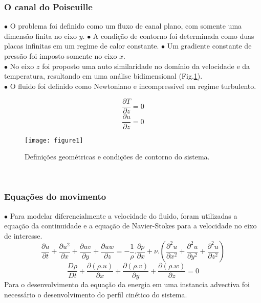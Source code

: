 \documentclass[xcolor=dvipsnames,10pt,aspectratio=169]{beamer}
\begin{document}
		\begin{frame}
			\frametitle{O canal do Poiseuille}
			$\bullet$ O problema foi definido como um fluxo de canal plano, com somente uma dimensão finita no eixo $y$. 
			$\bullet$ A condição de contorno foi determinada como duas placas infinitas em um regime de calor constante.
			$\bullet$ Um gradiente constante de pressão foi imposto somente no eixo $x$.\\
			$\bullet$ No eixo $z$ foi proposto uma auto similaridade no domínio da velocidade e da temperatura, resultando em uma análise bidimensional (Fig.\ref{figure.1}). \\
			$\bullet$ O fluido foi definido como Newtoniano e incompressível em regime turbulento.\\
			\begin{minipage}[h!]{0.2\textwidth}
				\begin{equation*}
				 \frac{\partial T }{\partial z} = 0
				\end{equation*}
				\begin{equation*}
				\frac{\partial u }{\partial z} = 0
				\end{equation*}
			\end{minipage}\hfill
			\begin{minipage}[h!]{0.75\textwidth}
			\begin{figure}[h!]
				\centering
				\texttt{[image: figure1]}
				\caption{Definições geométricas e condições de contorno do sistema.}
				\label{figure.1}
			\end{figure}
			\end{minipage}
			\\
		\end{frame}
	
	
	
	
	
		\begin{frame}
			\frametitle{Equações do movimento}
		$\bullet$ Para modelar diferencialmente a velocidade do fluido, foram utilizadas a equação da continuidade e a equação de Navier-Stokes para a velocidade no eixo de interesse.
		\begin{equation}
		\frac{\partial u}{\partial t} + \frac{\partial u^2}{\partial x} + \frac{\partial uv}{\partial y} + \frac{\partial uw}{\partial z} = - \frac{1}{\rho} . \frac{\partial {p}}{\partial x} + \nu . \left( \frac{\partial^2 u}{\partial x^2} + \frac{\partial^2 u}{\partial y^2} + \frac{\partial^2 u}{\partial z^2}   \right)
		\end{equation}
		\begin{equation}
		\frac{D \rho}{D t} +  \frac{\partial (\rho .u)}{\partial x} + \frac{\partial (\rho .v)}{\partial y} + \frac{\partial (\rho .w)}{\partial z} = 0
		\end{equation}
		Para o desenvolvimento da equação da energia em uma instancia advectiva foi necessário o desenvolvimento do perfil cinético do sistema.
		\end{frame}
	
\end{document}
